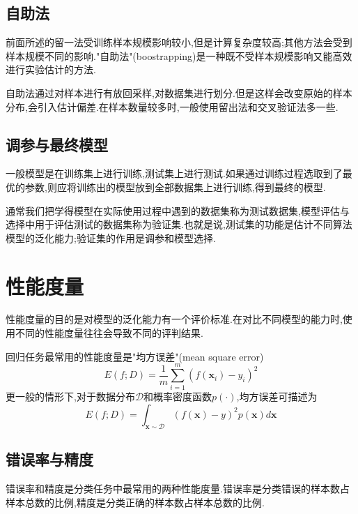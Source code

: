 \subsection{自助法}

前面所述的留一法受训练样本规模影响较小,但是计算复杂度较高;其他方法会受到样本规模不同的影响."自助法"(boostrapping)是一种既不受样本规模影响又能高效进行实验估计的方法.

自助法通过对样本进行有放回采样,对数据集进行划分.但是这样会改变原始的样本分布,会引入估计偏差.在样本数量较多时,一般使用留出法和交叉验证法多一些.

\subsection{调参与最终模型}

一般模型是在训练集上进行训练,测试集上进行测试.如果通过训练过程选取到了最优的参数,则应将训练出的模型放到全部数据集上进行训练,得到最终的模型.

通常我们把学得模型在实际使用过程中遇到的数据集称为测试数据集,模型评估与选择中用于评估测试的数据集称为验证集.也就是说,测试集的功能是估计不同算法模型的泛化能力;验证集的作用是调参和模型选择.

\section{性能度量}

性能度量的目的是对模型的泛化能力有一个评价标准.在对比不同模型的能力时,使用不同的性能度量往往会导致不同的评判结果.

回归任务最常用的性能度量是"均方误差"(mean square error)
\begin{equation}E(f;D)=\frac{1}{m}\sum_{i=1}^m(f(\mathbf x_i)-y_i)^2\end{equation}
更一般的情形下,对于数据分布$\mathcal D$和概率密度函数$p(\cdot)$,均方误差可描述为
\begin{equation}E(f;D)=\int_{\mathbf x\sim\mathcal D}(f(\mathbf x)-y)^2p(\mathbf x)d\mathbf x\end{equation}

\subsection{错误率与精度}

错误率和精度是分类任务中最常用的两种性能度量.错误率是分类错误的样本数占样本总数的比例,精度是分类正确的样本数占样本总数的比例.

